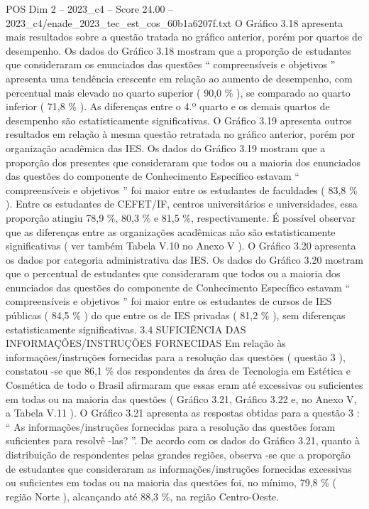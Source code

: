 \begin{textsample}{POS Dim 2 – 2023\_c4 – Score 24.00 – 2023\_c4/enade\_2023\_tec\_est\_cos\_60b1a6207f.txt}
O Gráfico 3.18 apresenta mais resultados sobre a questão tratada no gráfico anterior, porém por quartos de desempenho.
Os dados do Gráfico 3.18 mostram que a proporção de estudantes que consideraram os enunciados das questões “ compreensíveis e objetivos ” apresenta uma tendência crescente em relação ao aumento de desempenho, com percentual mais elevado no quarto superior ( 90,0 \% ), se comparado ao quarto inferior ( 71,8 \% ).
As diferenças entre o 4.º quarto e os demais quartos de desempenho são estatisticamente significativas.
O Gráfico 3.19 apresenta outros resultados em relação à mesma questão retratada no gráfico anterior, porém por organização acadêmica das IES.
Os dados do Gráfico 3.19 mostram que a proporção dos presentes que consideraram que todos ou a maioria dos enunciados das questões do componente de Conhecimento Específico estavam “ compreensíveis e objetivos ” foi maior entre os estudantes de faculdades ( 83,8 \% ).
Entre os estudantes de CEFET/IF, centros universitários e universidades, essa proporção atingiu 78,9 \%, 80,3 \% e 81,5 \%, respectivamente.
É possível observar que as diferenças entre as organizações acadêmicas não são estatisticamente significativas ( ver também Tabela V.10 no Anexo V ).
O Gráfico 3.20 apresenta os dados por categoria administrativa das IES.
Os dados do Gráfico 3.20 mostram que o percentual de estudantes que consideraram que todos ou a maioria dos enunciados das questões do componente de Conhecimento Específico estavam “ compreensíveis e objetivos ” foi maior entre os estudantes de cursos de IES públicas ( 84,5 \% ) do que entre os de IES privadas ( 81,2 \% ), sem diferenças estatisticamente significativas. 3.4 SUFICIÊNCIA DAS INFORMAÇÕES/INSTRUÇÕES FORNECIDAS Em relação às informações/instruções fornecidas para a resolução das questões ( questão 3 ), constatou -se que 86,1 \% dos respondentes da área de Tecnologia em Estética e Cosmética de todo o Brasil afirmaram que essas eram até excessivas ou suficientes em todas ou na maioria das questões ( Gráfico 3.21, Gráfico 3.22 e, no Anexo V, a Tabela V.11 ).
O Gráfico 3.21 apresenta as respostas obtidas para a questão 3 : “ As informações/instruções fornecidas para a resolução das questões foram suficientes para resolvê -las? ”.
De acordo com os dados do Gráfico 3.21, quanto à distribuição de respondentes pelas grandes regiões, observa -se que a proporção de estudantes que consideraram as informações/instruções fornecidas excessivas ou suficientes em todas ou na maioria das questões foi, no mínimo, 79,8 \% ( região Norte ), alcançando até 88,3 \%, na região Centro-Oeste.

\end{textsample}
